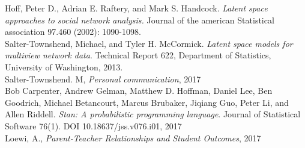 \documentclass[11pt]{scrartcl}
\begin{document}
Hoff, Peter D., Adrian E. Raftery, and Mark S. Handcock. \textit{Latent space approaches to social network analysis.} Journal of the american Statistical association 97.460 (2002): 1090-1098.\\

Salter-Townshend, Michael, and Tyler H. McCormick. \textit{Latent space models for multiview network data}. Technical Report 622, Department of Statistics, University of Washington, 2013.\\

Salter-Townshend. M, \textit{Personal communication}, 2017\\

Bob Carpenter, Andrew Gelman, Matthew D. Hoffman, Daniel Lee, Ben Goodrich, Michael Betancourt, Marcus Brubaker, Jiqiang Guo, Peter Li, and Allen Riddell. \textit{Stan: A probabilistic programming language}. Journal of Statistical Software 76(1). DOI 10.18637/jss.v076.i01, 2017\\

Loewi, A., \textit{Parent-Teacher Relationships and Student Outcomes}, 2017




\end{document}

